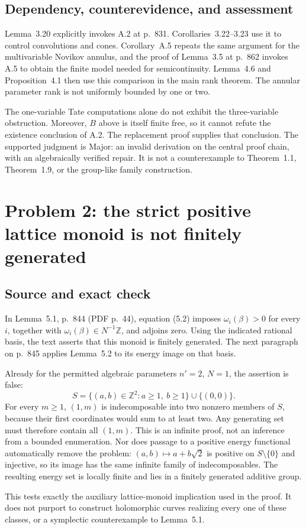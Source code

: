 \documentclass[10pt]{article}
\begin{document}
\subsection*{Dependency, counterevidence, and assessment}
Lemma 3.20 explicitly invokes A.2 at p. 831. Corollaries 3.22–3.23 use it to control convolutions and cones. Corollary A.5 repeats the same argument for the multivariable Novikov annulus, and the proof of Lemma 3.5 at p. 862 invokes A.5 to obtain the finite model needed for semicontinuity. Lemma 4.6 and Proposition 4.1 then use this comparison in the main rank theorem. The annular parameter rank is not uniformly bounded by one or two.\par
The one-variable Tate computations alone do not exhibit the three-variable obstruction. Moreover, \(B\) above is itself finite free, so it cannot refute the existence conclusion of A.2. The replacement proof supplies that conclusion. The supported judgment is Major: an invalid derivation on the central proof chain, with an algebraically verified repair. It is not a counterexample to Theorem 1.1, Theorem 1.9, or the group-like family construction.\par
\section*{Problem 2: the strict positive lattice monoid is not finitely generated}
\subsection*{Source and exact check}
In Lemma 5.1, p. 844 (PDF p. 44), equation (5.2) imposes \(\omega_i(\beta)>0\) for every \(i\), together with \(\omega_i(\beta)\in N^{-1}\mathbb Z\), and adjoins zero. Using the indicated rational basis, the text asserts that this monoid is finitely generated. The next paragraph on p. 845 applies Lemma 5.2 to its energy image on that basis.\par
Already for the permitted algebraic parameters \(n'=2\), \(N=1\), the assertion is false: \[S=\{(a,b)\in\mathbb Z^2:a\ge1,\ b\ge1\}\cup\{(0,0)\}.\] For every \(m\ge1\), \((1,m)\) is indecomposable into two nonzero members of \(S\), because their first coordinates would sum to at least two. Any generating set must therefore contain all \((1,m)\). This is an infinite proof, not an inference from a bounded enumeration. Nor does passage to a positive energy functional automatically remove the problem: \((a,b)\mapsto a+b\sqrt2\) is positive on \(S\setminus\{0\}\) and injective, so its image has the same infinite family of indecomposables. The resulting energy set is locally finite and lies in a finitely generated additive group.\par
This tests exactly the auxiliary lattice-monoid implication used in the proof. It does not purport to construct holomorphic curves realizing every one of these classes, or a symplectic counterexample to Lemma 5.1.\par
\end{document}

